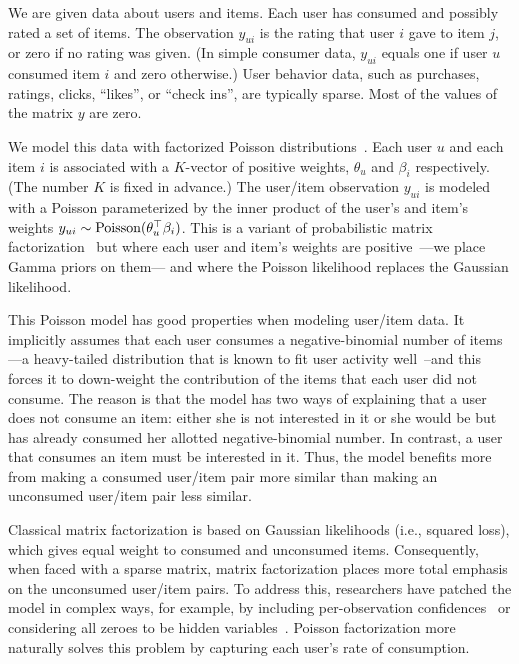 \documentclass{sig-alternate}
\begin{document}
We are given data about users and items.  Each user has consumed and
possibly rated a set of items.  The observation $y_{ui}$ is the rating
that user $i$ gave to item $j$, or zero if no rating was given.  (In
simple consumer data, $y_{ui}$ equals one if user $u$ consumed item
$i$ and zero otherwise.)  User behavior data, such as purchases,
ratings, clicks, ``likes'', or ``check ins'', are typically sparse.
Most of the values of the matrix $y$ are zero.

We model this data with factorized Poisson
distributions~\cite{Canny:2004}. Each user $u$ and each item $i$ is
associated with a $K$-vector of positive weights, $\theta_u$ and
$\beta_i$ respectively.  (The number $K$ is fixed in advance.)  The
user/item observation $y_{ui}$ is modeled with a Poisson parameterized
by the inner product of the user's and item's weights $y_{ui} \sim
\textrm{Poisson}(\theta_u^\top \beta_i)$.  This is a variant of
probabilistic matrix factorization~\cite{Salakhutdinov:2008a} but
where each user and item's weights are positive~\cite{Lee:1999}---we
place Gamma priors on them--- and where the Poisson likelihood
replaces the Gaussian likelihood.


This Poisson model has good properties when modeling user/item data.
It implicitly assumes that each user consumes a negative-binomial number of
items---a heavy-tailed distribution that is known to fit user activity
well~\cite{Goodhardt:1984}--and this forces it to down-weight the
contribution of the items that each user did not consume. The reason
is that the model has two ways of explaining that a user does not
consume an item: either she is not interested in it or she would be
but has already consumed her allotted negative-binomial number.  In
contrast, a user that consumes an item must be interested in it.
Thus, the model benefits more from making a consumed user/item pair
more similar than making an unconsumed user/item pair less similar.

Classical matrix factorization is based on Gaussian likelihoods (i.e.,
squared loss), which gives equal weight to consumed and unconsumed
items.  Consequently, when faced with a sparse matrix, matrix
factorization places more total emphasis on the unconsumed user/item
pairs.  To address this, researchers have patched the model in complex
ways, for example, by including per-observation
confidences~\cite{Koren:2009} or considering all zeroes to be hidden
variables~\cite{Paquet:2013p9197}.  Poisson factorization more naturally solves this
problem by capturing each user's rate of consumption.
\end{document}
